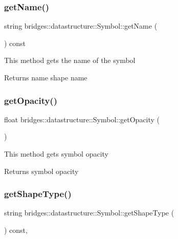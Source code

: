 \subsubsection{\texorpdfstring{getName()}{getName()}}
{\footnotesize\ttfamily string bridges\+::datastructure\+::\+Symbol\+::get\+Name (\begin{DoxyParamCaption}{ }\end{DoxyParamCaption}) const\hspace{0.3cm}{\ttfamily [inline]}}

This method gets the name of the symbol

\begin{DoxyReturn}{Returns}
name shape name 
\end{DoxyReturn}
\mbox{\label{classbridges_1_1datastructure_1_1_symbol_af77f6e4c42ca97672888d863335b851a}} 
\subsubsection{\texorpdfstring{getOpacity()}{getOpacity()}}
{\footnotesize\ttfamily float bridges\+::datastructure\+::\+Symbol\+::get\+Opacity (\begin{DoxyParamCaption}{ }\end{DoxyParamCaption})\hspace{0.3cm}{\ttfamily [inline]}}

This method gets symbol opacity

\begin{DoxyReturn}{Returns}
symbol opacity 
\end{DoxyReturn}
\mbox{\label{classbridges_1_1datastructure_1_1_symbol_a8f8378ed4009865611ce8b93e4432211}} 
\subsubsection{\texorpdfstring{getShapeType()}{getShapeType()}}
{\footnotesize\ttfamily string bridges\+::datastructure\+::\+Symbol\+::get\+Shape\+Type (\begin{DoxyParamCaption}{ }\end{DoxyParamCaption}) const\hspace{0.3cm}{\ttfamily [inline]}, {\ttfamily [protected]}}

